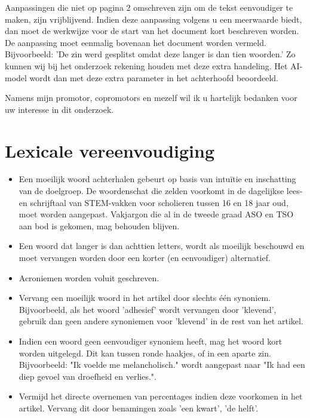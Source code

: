 	\medspace
	
Aanpassingen die niet op pagina 2 omschreven zijn om de tekst eenvoudiger te maken, zijn vrijblijvend. Indien deze aanpassing volgens u een meerwaarde biedt, dan moet de werkwijze voor de start van het document kort beschreven worden. De aanpassing moet eenmalig bovenaan het document worden vermeld. Bijvoorbeeld: 'De zin werd gesplitst omdat deze langer is dan tien woorden.' Zo kunnen wij bij het onderzoek rekening houden met deze extra handeling. Het AI-model wordt dan met deze extra parameter in het achterhoofd beoordeeld.
	
	\medspace
	
Namens mijn promotor, copromotors en mezelf wil ik u hartelijk bedanken voor uw interesse in dit onderzoek.
	
	\newpage
	
\section{Lexicale vereenvoudiging}
	
\begin{itemize}
	\item Een moeilijk woord achterhalen gebeurt op basis van intuïtie en inschatting van de doelgroep. De woordenschat die zelden voorkomt in de dagelijkse lees- en schrijftaal van STEM-vakken voor scholieren tussen 16 en 18 jaar oud, moet worden aangepast. Vakjargon die al in de tweede graad ASO en TSO aan bod is gekomen, mag behouden blijven.
	\item Een woord dat langer is dan achttien letters, wordt als moeilijk beschouwd en moet vervangen worden door een korter (en eenvoudiger) alternatief.
	\item Acroniemen worden voluit geschreven.
	\item Vervang een moeilijk woord in het artikel door slechts één synoniem. Bijvoorbeeld, als het woord 'adhesief' wordt vervangen door 'klevend', gebruik dan geen andere synoniemen voor 'klevend' in de rest van het artikel. 
	\item Indien een woord geen eenvoudiger synoniem heeft, mag het woord kort worden uitgelegd. Dit kan tussen ronde haakjes, of in een aparte zin. Bijvoorbeeld: "Ik voelde me melancholisch." wordt aangepast naar "Ik had een diep gevoel van droefheid en verlies.".		
		\item Vermijd het directe overnemen van percentages indien deze voorkomen in het artikel. Vervang dit door benamingen zoals 'een kwart', 'de helft'. 
	\end{itemize}
	
